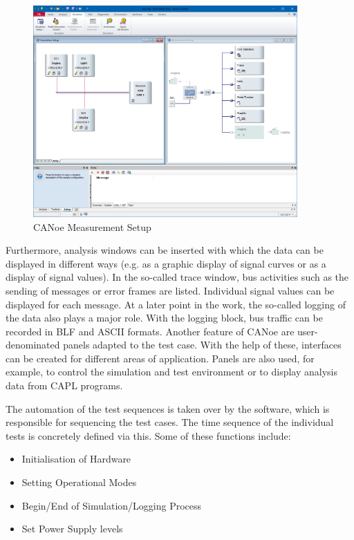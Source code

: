 \begin{figure}[H]
	\centering
	\includegraphics[width= 0.9\textwidth]{images/CANoe_Simulation_setup.png}
	\caption[CANoe Simulation and Measurement Setup]{CANoe Measurement Setup \cite{CANOE} } 
	\label{fig:Measurement Setup}
\end{figure}

Furthermore, analysis windows can be inserted with which the data can be displayed in different ways (e.g. as a graphic display of signal curves or as a display of signal values). In the so-called trace window, bus activities such as the sending of messages or error frames are listed. Individual signal values can be displayed for each message. At a later point in the work, the so-called logging of the data also plays a major role. With the logging block, bus traffic can be recorded in BLF and ASCII formats. Another feature of CANoe are user-denominated panels adapted to the test case. With the help of these, interfaces can be created for different areas of application. Panels are also used, for example, to control the simulation and test environment or to display analysis data from CAPL programs.

The automation of the test sequences is taken over by the software, which is responsible for sequencing the test cases. The time sequence of the individual tests is concretely defined via this. Some of these functions include:

\begin{itemize}
    \item Initialisation of Hardware
    \item Setting Operational Modes
    \item Begin/End of Simulation/Logging Process
    \item Set Power Supply levels
\end{itemize}

